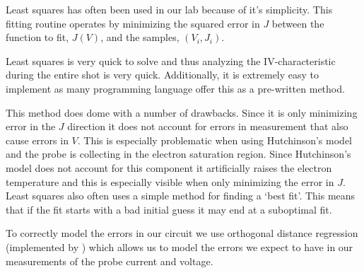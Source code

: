 
Least squares has often been used in our lab because of it's simplicity. This fitting routine operates by minimizing the squared error in $J$ between the function to fit, $J(V)$, and the samples, $(V_i, J_i)$.


Least squares is very quick to solve and thus analyzing the IV-characteristic during the entire shot is very quick. Additionally, it is extremely easy to implement as many programming language offer this as a pre-written method.


This method does dome with a number of drawbacks. Since it is only minimizing error in the $J$ direction it does not account for errors in measurement that also cause errors in $V$. This is especially problematic when using Hutchinson's model and the probe is collecting in the electron saturation region. Since Hutchinson's model does not account for this component it artificially raises the electron temperature and this is especially visible when only minimizing the error in $J$. Least squares also often uses a simple method for finding a `best fit'. This means that if the fit starts with a bad initial guess it may end at a suboptimal fit.


To correctly model the errors in our circuit we use orthogonal distance regression (implemented by \cite{Boggs_Byrd_Rogers_Schnabel}) which allows us to model the errors we expect to have in our measurements of the probe current and voltage.


